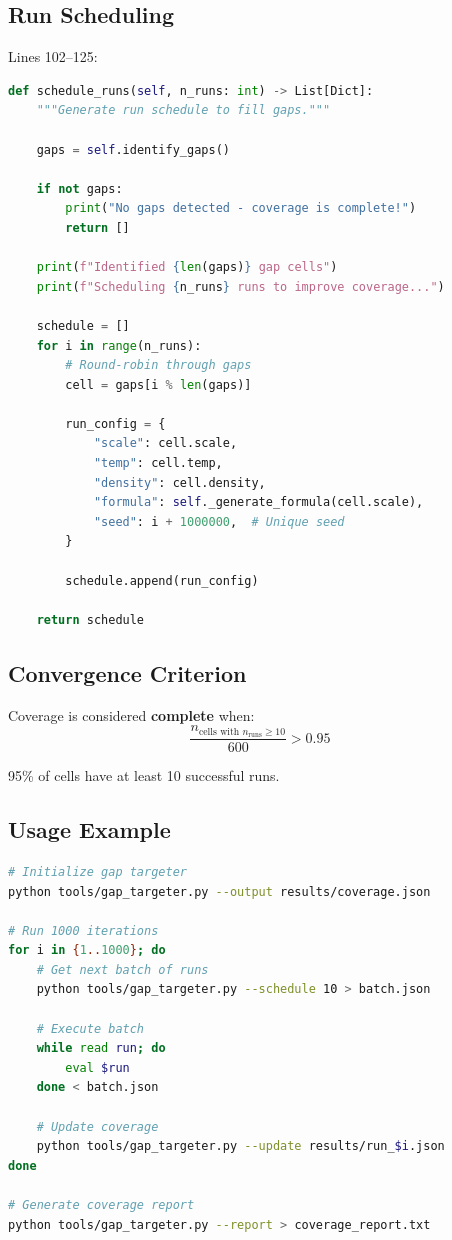 \documentclass[11pt]{article}
\begin{document}
\subsection{Run Scheduling}

Lines 102--125:

\begin{lstlisting}[language=Python]
def schedule_runs(self, n_runs: int) -> List[Dict]:
    """Generate run schedule to fill gaps."""
    
    gaps = self.identify_gaps()
    
    if not gaps:
        print("No gaps detected - coverage is complete!")
        return []
    
    print(f"Identified {len(gaps)} gap cells")
    print(f"Scheduling {n_runs} runs to improve coverage...")
    
    schedule = []
    for i in range(n_runs):
        # Round-robin through gaps
        cell = gaps[i % len(gaps)]
        
        run_config = {
            "scale": cell.scale,
            "temp": cell.temp,
            "density": cell.density,
            "formula": self._generate_formula(cell.scale),
            "seed": i + 1000000,  # Unique seed
        }
        
        schedule.append(run_config)
    
    return schedule
\end{lstlisting}

\subsection{Convergence Criterion}

Coverage is considered \textbf{complete} when:
\begin{equation}
\frac{n_{\text{cells with } n_{\text{runs}} \geq 10}}{600} > 0.95
\end{equation}

95\% of cells have at least 10 successful runs.

\subsection{Usage Example}

\begin{lstlisting}[language=bash]
# Initialize gap targeter
python tools/gap_targeter.py --output results/coverage.json

# Run 1000 iterations
for i in {1..1000}; do
    # Get next batch of runs
    python tools/gap_targeter.py --schedule 10 > batch.json
    
    # Execute batch
    while read run; do
        eval $run
    done < batch.json
    
    # Update coverage
    python tools/gap_targeter.py --update results/run_$i.json
done

# Generate coverage report
python tools/gap_targeter.py --report > coverage_report.txt
\end{lstlisting}
\end{document}
